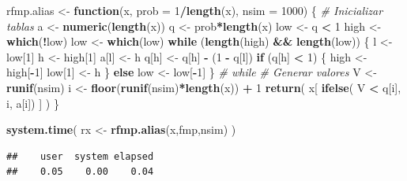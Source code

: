 \documentclass[
]{book}
\newenvironment{Shaded}{\begin{snugshade}}{\end{snugshade}}
\newcommand{\CommentTok}[1]{\textcolor[rgb]{0.56,0.35,0.01}{\textit{#1}}}
\newcommand{\ControlFlowTok}[1]{\textcolor[rgb]{0.13,0.29,0.53}{\textbf{#1}}}
\newcommand{\DataTypeTok}[1]{\textcolor[rgb]{0.13,0.29,0.53}{#1}}
\newcommand{\DecValTok}[1]{\textcolor[rgb]{0.00,0.00,0.81}{#1}}
\newcommand{\KeywordTok}[1]{\textcolor[rgb]{0.13,0.29,0.53}{\textbf{#1}}}
\newcommand{\NormalTok}[1]{#1}
\newcommand{\OperatorTok}[1]{\textcolor[rgb]{0.81,0.36,0.00}{\textbf{#1}}}
\newcommand{\StringTok}[1]{\textcolor[rgb]{0.31,0.60,0.02}{#1}}
\theoremstyle{break}
\theoremstyle{definition}
\theoremstyle{definition}
\theoremstyle{definition}
\theoremstyle{remark}
\begin{document}
\begin{Shaded}
\begin{Highlighting}[]
\NormalTok{rfmp.alias <-}\StringTok{ }\ControlFlowTok{function}\NormalTok{(x, }\DataTypeTok{prob =} \DecValTok{1}\OperatorTok{/}\KeywordTok{length}\NormalTok{(x), }\DataTypeTok{nsim =} \DecValTok{1000}\NormalTok{) \{}
  \CommentTok{# Inicializar tablas}
\NormalTok{  a <-}\StringTok{ }\KeywordTok{numeric}\NormalTok{(}\KeywordTok{length}\NormalTok{(x))}
\NormalTok{  q <-}\StringTok{ }\NormalTok{prob}\OperatorTok{*}\KeywordTok{length}\NormalTok{(x)}
\NormalTok{  low <-}\StringTok{ }\NormalTok{q }\OperatorTok{<}\StringTok{ }\DecValTok{1}
\NormalTok{  high <-}\StringTok{ }\KeywordTok{which}\NormalTok{(}\OperatorTok{!}\NormalTok{low)}
\NormalTok{  low <-}\StringTok{ }\KeywordTok{which}\NormalTok{(low)}
  \ControlFlowTok{while}\NormalTok{ (}\KeywordTok{length}\NormalTok{(high) }\OperatorTok{&&}\StringTok{ }\KeywordTok{length}\NormalTok{(low)) \{}
\NormalTok{    l <-}\StringTok{ }\NormalTok{low[}\DecValTok{1}\NormalTok{]}
\NormalTok{    h <-}\StringTok{ }\NormalTok{high[}\DecValTok{1}\NormalTok{]}
\NormalTok{    a[l] <-}\StringTok{ }\NormalTok{h}
\NormalTok{    q[h] <-}\StringTok{ }\NormalTok{q[h] }\OperatorTok{-}\StringTok{ }\NormalTok{(}\DecValTok{1} \OperatorTok{-}\StringTok{ }\NormalTok{q[l])}
    \ControlFlowTok{if}\NormalTok{ (q[h] }\OperatorTok{<}\StringTok{ }\DecValTok{1}\NormalTok{) \{}
\NormalTok{      high <-}\StringTok{ }\NormalTok{high[}\OperatorTok{-}\DecValTok{1}\NormalTok{]}
\NormalTok{      low[}\DecValTok{1}\NormalTok{] <-}\StringTok{ }\NormalTok{h}
\NormalTok{    \} }\ControlFlowTok{else}\NormalTok{ low <-}\StringTok{ }\NormalTok{low[}\OperatorTok{-}\DecValTok{1}\NormalTok{]}
\NormalTok{  \} }\CommentTok{# while}
  \CommentTok{# Generar valores}
\NormalTok{  V <-}\StringTok{ }\KeywordTok{runif}\NormalTok{(nsim)}
\NormalTok{  i <-}\StringTok{ }\KeywordTok{floor}\NormalTok{(}\KeywordTok{runif}\NormalTok{(nsim)}\OperatorTok{*}\KeywordTok{length}\NormalTok{(x)) }\OperatorTok{+}\StringTok{ }\DecValTok{1}
  \KeywordTok{return}\NormalTok{( x[ }\KeywordTok{ifelse}\NormalTok{( V }\OperatorTok{<}\StringTok{ }\NormalTok{q[i], i, a[i]) ] )}
\NormalTok{\}}


\KeywordTok{system.time}\NormalTok{( rx <-}\StringTok{ }\KeywordTok{rfmp.alias}\NormalTok{(x,fmp,nsim) )}
\end{Highlighting}
\end{Shaded}

\begin{verbatim}
##    user  system elapsed 
##    0.05    0.00    0.04
\end{verbatim}
\end{document}
